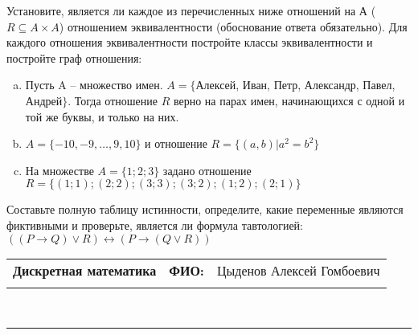 \documentclass[10pt]{exam}
\newcommand{\class}{Дискретная математика}
\newcommand{\examdate}{}
\begin{document}
\begin{questions}
\question
Установите, является ли каждое из перечисленных ниже отношений на А ($R \subseteq A \times A$) отношением эквивалентности (обоснование ответа обязательно). Для каждого отношения эквивалентности постройте классы 
эквивалентности и постройте граф отношения:
\begin{enumerate} [a)]\setcounter{enumi}{0}
\item Пусть A – множество имен. $A = \{ $Алексей, Иван, Петр, Александр, Павел, Андрей$ \}$. Тогда отношение $R$ верно на парах имен, начинающихся с одной и той же буквы, и только на них.
\item $A = \{-10, -9, … , 9, 10\}$ и отношение $ R = \{(a,b)|a^{2} = b^{2}\}$
\item На множестве $A = \{1; 2; 3\}$ задано отношение $R = \{(1; 1); (2; 2); (3; 3); (3; 2); (1; 2); (2; 1)\}$
\end{enumerate}\question Составьте полную таблицу истинности, определите, какие переменные являются фиктивными и проверьте, является ли формула тавтологией:
$((P \rightarrow Q) \lor R) \leftrightarrow (P \rightarrow (Q \lor R))$

\end{questions}
\newpage
\begin{flushright}
\begin{tabular}{p{2.8in} r l}
\textbf{\class} & \textbf{ФИО:} &Цыденов Алексей Гомбоевич
\\

\textbf{\examdate} &&\\
\end{tabular}\\
\end{flushright}
\rule[1ex]{\textwidth}{.1pt}
\end{document}
